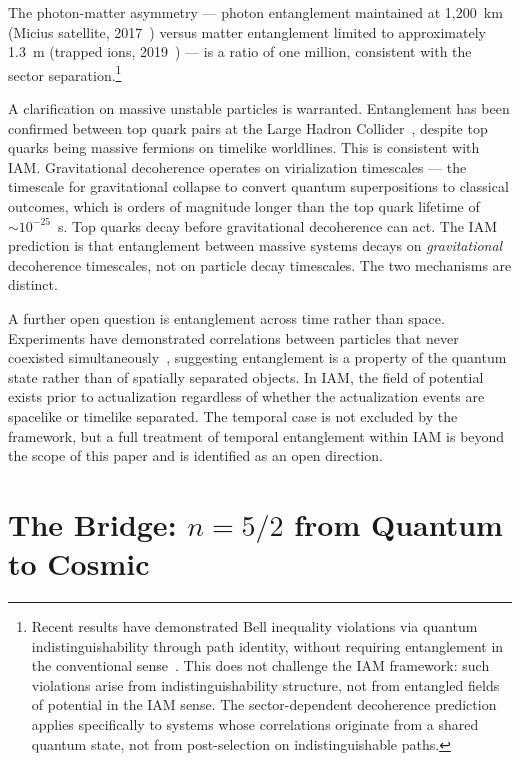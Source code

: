 \documentclass[12pt,a4paper]{article}
\begin{document}
The photon-matter asymmetry --- photon entanglement maintained at
1,200~km (Micius satellite, 2017~\citep{Yin2017}) versus matter
entanglement limited to approximately 1.3~m (trapped ions,
2019~\citep{Hensen2015}) --- is a ratio of one million, consistent with
the sector separation.\footnote{Recent results have demonstrated Bell
inequality violations via quantum indistinguishability through path
identity, without requiring entanglement in the conventional
sense~\citep{SciAdv2025}. This does not challenge the IAM framework:
such violations arise from indistinguishability structure, not from
entangled fields of potential in the IAM sense. The sector-dependent
decoherence prediction applies specifically to systems whose correlations
originate from a shared quantum state, not from post-selection on
indistinguishable paths.}

A clarification on massive unstable particles is warranted. Entanglement
has been confirmed between top quark pairs at the Large Hadron
Collider~\citep{CMS2024}, despite top quarks being massive fermions on
timelike worldlines. This is consistent with IAM. Gravitational
decoherence operates on virialization timescales --- the timescale for
gravitational collapse to convert quantum superpositions to classical
outcomes, which is orders of magnitude longer than the top quark lifetime
of $\sim 10^{-25}$~s. Top quarks decay before gravitational decoherence
can act. The IAM prediction is that entanglement between massive systems
decays on \textit{gravitational} decoherence timescales, not on particle
decay timescales. The two mechanisms are distinct.

A further open question is entanglement across time rather than space.
Experiments have demonstrated correlations between particles that never
coexisted simultaneously~\citep{Megidish2013}, suggesting entanglement
is a property of the quantum state rather than of spatially separated
objects. In IAM, the field of potential exists prior to actualization
regardless of whether the actualization events are spacelike or timelike
separated. The temporal case is not excluded by the framework, but a
full treatment of temporal entanglement within IAM is beyond the scope
of this paper and is identified as an open direction.

\section{The Bridge: $n = 5/2$ from Quantum to Cosmic}
\label{sec:bridge}
\end{document}
